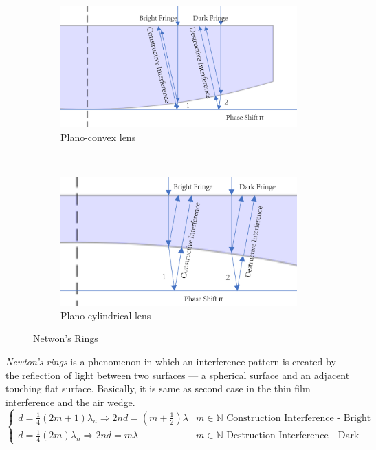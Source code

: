 \documentclass[openany]{book}
\begin{document}
\begin{figure}[H]
    \centering
    \begin{subfigure}[b]{0.45\textwidth}
        \includegraphics[width=\textwidth]{Figure/Air_Wedge.PNG}
        \caption{Plano-convex lens}
        \label{fig:Plano-convex lens}
    \end{subfigure}
    ~
    \begin{subfigure}[b]{0.45\textwidth}
        \includegraphics[width=\textwidth]{Figure/Air_Wedge2.PNG}
        \caption{Plano-cylindrical lens}
        \label{fig:Plano-cylindrical lens}
    \end{subfigure}
    \caption{Netwon's Rings}\label{fig:Newton's Rings}
\end{figure}
\emph{Newton's rings} is a phenomenon in which an interference pattern is created by the reflection of light between two surfaces — a spherical surface and an adjacent touching flat surface. Basically, it is same as second case in the thin film interference and the air wedge.
\[\begin{cases}
d = \frac{1}{4}(2m+1)\lambda _n\Rightarrow 2nd=\left(m+\frac{1}{2}\right)\lambda &m\in \mathbb{N} \textrm{ Construction Interference - Bright Fringe}\\
d = \frac{1}{4}(2m)\lambda _n\Rightarrow 2nd=m\lambda &m\in \mathbb{N} \textrm{ Destruction Interference  - Dark Fringe}
\end{cases}\]
\end{document}
